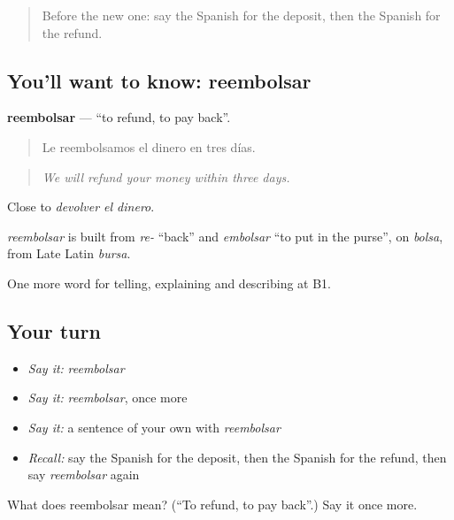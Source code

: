 \label{lesson:ES-C663-reembolsar}



\begin{quote}
Before the new one: say the Spanish for the deposit, then the Spanish for the refund.
\end{quote}

\subsection*{You'll want to know: reembolsar}
\textbf{reembolsar} — \textquotedblleft{}to refund, to pay back\textquotedblright{}.

\begin{quote}
Le reembolsamos el dinero en tres días.
\end{quote}

\begin{quote}
\emph{We will refund your money within three days.}
\end{quote}

Close to \emph{devolver el dinero}.

\begin{cousinweb}
\emph{reembolsar} is built from \emph{re-} \textquotedblleft{}back\textquotedblright{} and \emph{embolsar} \textquotedblleft{}to put in the purse\textquotedblright{}, on \emph{bolsa}, from Late Latin \emph{bursa}.
\end{cousinweb}

\begin{grammarlens}[title={What you've built}]
One more word for telling, explaining and describing at B1.
\end{grammarlens}

\subsection*{Your turn}
\begin{itemize}
\raggedright
  \item \emph{Say it:} \emph{reembolsar}
  \item \emph{Say it:} \emph{reembolsar}, once more
  \item \emph{Say it:} a sentence of your own with \emph{reembolsar}
  \item \emph{Recall:} say the Spanish for the deposit, then the Spanish for the refund, then say \emph{reembolsar} again
\end{itemize}

\begin{tcolorbox}[breakable,colback=teal!4,colframe=teal!35!black,title={Before you move on}]
What does reembolsar mean? (\textquotedblleft{}To refund, to pay back\textquotedblright{}.) Say it once more.
\end{tcolorbox}
